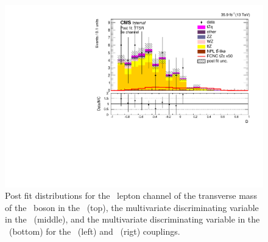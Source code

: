 \begin{figure}[htbp]
	\includegraphics[width=0.49\linewidth]{6_Search/Figures/ZctFit/shapes_fit_s_LepChan_3e_TTSR_error_trial.pdf}
	\caption{Post fit distributions for the \eee\  lepton channel of the transverse mass of the \PW\ boson in the \WZCR\ (top), the multivariate discriminating variable in the \STSR\ (middle), and the multivariate discriminating variable in the \TTSR\ (bottom) for the \Zut\ (left) and \Zct\ (rigt) couplings. }
	\label{fig:shapesfit3e}
\end{figure}
\newpage
